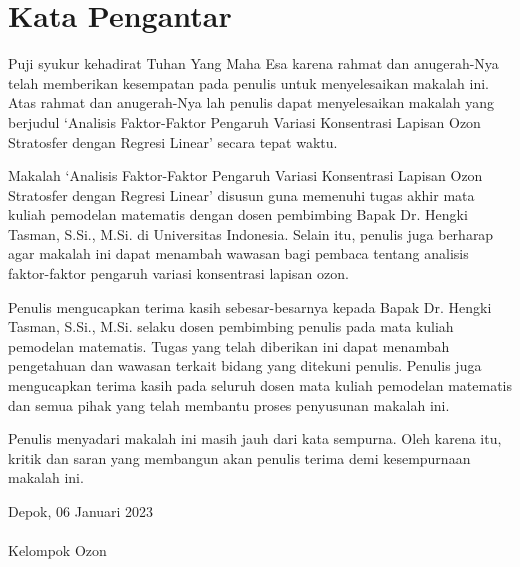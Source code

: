 \chapter*{Kata Pengantar}

Puji syukur kehadirat Tuhan Yang Maha Esa karena rahmat dan anugerah-Nya telah memberikan kesempatan pada penulis untuk menyelesaikan makalah ini. Atas rahmat dan anugerah-Nya lah penulis dapat menyelesaikan makalah yang berjudul ‘Analisis Faktor-Faktor Pengaruh Variasi  Konsentrasi Lapisan Ozon Stratosfer dengan Regresi Linear’ secara tepat waktu.

Makalah ‘Analisis Faktor-Faktor Pengaruh Variasi Konsentrasi Lapisan Ozon Stratosfer dengan Regresi Linear’ disusun guna memenuhi tugas akhir mata kuliah pemodelan matematis dengan dosen pembimbing Bapak Dr. Hengki Tasman, S.Si., M.Si. di Universitas Indonesia. Selain itu, penulis juga berharap agar makalah ini dapat menambah wawasan bagi pembaca tentang analisis faktor-faktor pengaruh variasi konsentrasi lapisan ozon.

Penulis mengucapkan terima kasih sebesar-besarnya kepada Bapak Dr. Hengki Tasman, S.Si., M.Si. selaku dosen pembimbing penulis pada mata kuliah pemodelan matematis. Tugas yang telah diberikan ini dapat menambah pengetahuan dan wawasan terkait bidang yang ditekuni penulis. Penulis juga mengucapkan terima kasih pada seluruh dosen mata kuliah pemodelan matematis dan semua pihak yang telah membantu proses penyusunan makalah ini.

Penulis menyadari makalah ini masih jauh dari kata sempurna. Oleh karena itu, kritik dan saran yang membangun akan penulis terima demi kesempurnaan makalah ini.


\vspace*{0.2cm}
\begin{flushright}
Depok, 06 Januari 2023 \\[0.1cm]
\vspace*{1.5cm}
\\Kelompok Ozon

\end{flushright}